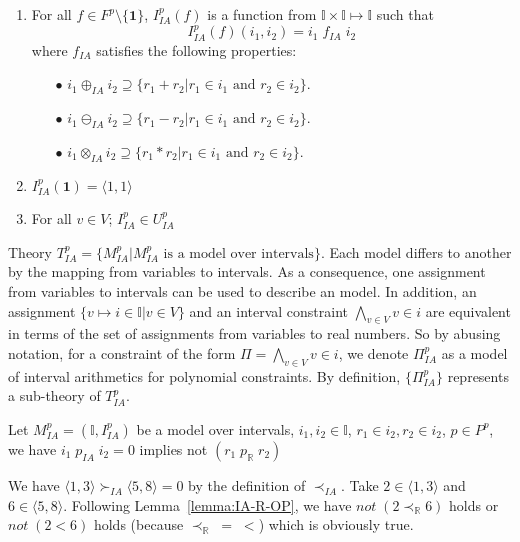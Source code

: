 \begin{enumerate}
\item For all $f \in F^p \setminus \{\mathbf{1}\}$, $I^p_{IA}(f)$ is a function from $\mathbb{I} \times \mathbb{I} \mapsto \mathbb{I}$ such that \[I^p_{IA}(f)(i_1, i_2)= i_1 \; f_{IA} \; i_2\] where $f_{IA}$ satisfies the following properties:
\begin{itemize}
\item[$\bullet$] $i_1 \oplus_{IA} i_2 \supseteq \{r_1 + r_2| r_1 \in i_1 \text{ and } r_2 \in i_2\}$.
\item[$\bullet$] $i_1 \ominus_{IA} i_2 \supseteq \{r_1 - r_2| r_1 \in i_1 \text{ and } r_2 \in i_2\}$.
\item[$\bullet$] $i_1 \otimes_{IA} i_2 \supseteq \{r_1 * r_2| r_1 \in i_1 \text{ and } r_2 \in i_2\}$.
\end{itemize}
\item $I^p_{IA}(\mathbf{1}) = \langle 1,1\rangle $
\item For all $v \in V$; $I^p_{IA} \in U^p_{IA}$
\end{enumerate}
Theory $T^p_{IA} = \{M^p_{IA}| M^p_{IA} \text{ is a model over intervals}\}$. Each model differs to another by the mapping from variables to intervals. As a consequence, one assignment from variables to intervals can be used to describe an model. In addition, an assignment $\{v \mapsto i \in \mathbb{I} | v \in V\}$ and an interval constraint $\bigwedge\limits_{v \in V} v \in i$ are equivalent in terms of the set of assignments from variables to real numbers. So by abusing notation, for a constraint of the form $\Pi = \bigwedge\limits_{v \in V} v \in i$, we denote $\Pi^p_{IA}$ as a model of interval arithmetics for polynomial constraints. By definition, $\{\Pi^p_{IA}\}$ represents a sub-theory of $T^p_{IA}$.

\begin{lemma} \label{lemma:IA-R-OP}
Let $M^p_{IA} = (\mathbb{I}, I^p_{IA})$ be a model over intervals, ${i_1, i_2 \in \mathbb{I}}$, ${r_1 \in i_2, r_2 \in i_2}$, ${p \in P^p}$, we have ${i_1 \; p_{IA} \; i_2 = 0}$ implies not $(r_1 \; p_\mathbb{R} \; r_2)$
\end{lemma}


\begin{example}
We have $\langle 1, 3 \rangle \succ_{IA} \langle 5, 8 \rangle = 0$ by the definition of $\prec_{IA}$. Take $2 \in \langle 1, 3 \rangle$ and $6 \in \langle 5, 8 \rangle$. Following Lemma~\ref{lemma:IA-R-OP}, we have $not \; (2 \prec_\mathbb{R} 6)$ holds or $not \; (2 < 6)$ holds (because $\prec_\mathbb{R} \; = \; <$) which is obviously true.
\end{example}

